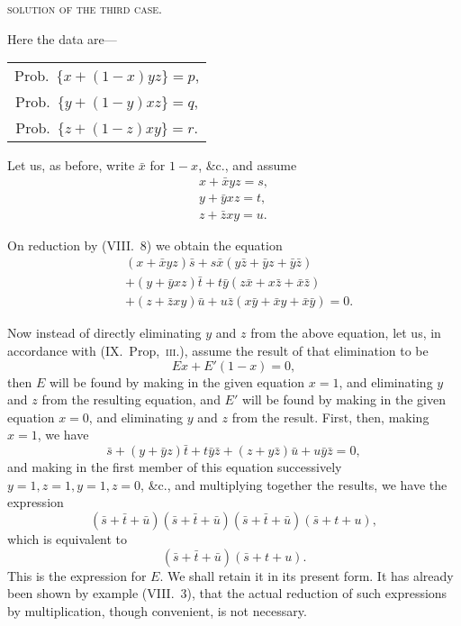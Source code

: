 \documentclass[oneside]{book}
\begin{document}
\begin{center}\textsc{solution of the third case.}\end{center}

Here the data are---
\begin{tabular}{c}
  Prob.\ $\{x + (1-x)yz\} = p$, \\
  Prob.\ $\{y + (1-y)xz\} = q$, \\
  Prob.\ $\{z + (1-z)xy\} = r$.
\end{tabular}

Let us, as before, write $\bar{x}$ for $1-x$, \&c., and assume
\begin{align*}
  x + \bar{x}yz = s,  \\
  y + \bar{y}xz = t,  \\
  z + \bar{z}xy = u.
\end{align*}

On reduction by (VIII.~8) we obtain the equation
\setcounter{equation}{4}
\begin{equation}
\begin{split}
  &(x + \bar{x}yz)\bar{s}
+ s\bar{x}(y\bar{z} + \bar{y}z + \bar{y}\bar{z})
\\
  &+ (y + \bar{y}xz)\bar{t}
+ t\bar{y}(z\bar{x} + x\bar{z} + \bar{x}\bar{z})
\\
  &+ (z + \bar{z}xy)\bar{u}
+ u\bar{z}(x\bar{y} + \bar{x}y + \bar{x}\bar{y}) = 0.   %
\end{split}
\end{equation}

Now instead of directly eliminating $y$ and $z$ from the above
equation, let us, in accordance with (IX.~Prop,~\textsc{iii}.), assume the
result of that elimination to be
\begin{equation*}
Ex + E'(1-x) = 0,
\end{equation*}
then $E$ will be found by making in the given equation $x = 1$,
and eliminating $y$ and $z$ from the resulting equation, and $E'$ will
be found by making in the given equation $x = 0$, and eliminating
$y$ and $z$ from the result. First, then, making $x = 1$, we have
\[
\bar{s} + (y + \bar{y}z)\bar{t} + t\bar{y}\bar{z} + (z + y\bar{z})\bar{u} + u\bar{y}\bar{z} = 0,
\]
and making in the first member of this equation successively
$y = 1, z = 1, y = 1, z = 0$, \&c., and multiplying together the
results, we have the expression
\[
(\bar{s} + \bar{t} + \bar{u})(\bar{s} + \bar{t} + \bar{u})(\bar{s} + \bar{t} + \bar{u})(\bar{s} + t + u),
\]
which is equivalent to
\[
(\bar{s} + \bar{t} + \bar{u})(\bar{s} + t + u).
\]
This is the expression for $E$. We shall retain it in its present
form. It has already been shown by example (VIII.~3), that
the actual reduction of such expressions by multiplication, though
convenient, is not necessary.
\end{document}
